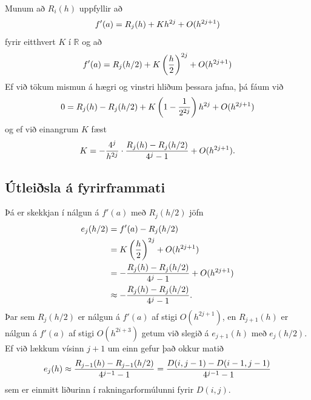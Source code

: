 \documentclass[letterpaper,10pt,icelandic]{sphinxmanual}
\begin{document}
Munum að \(R_i(h)\) uppfyllir að
\begin{gather}
\begin{split}f'(a) = R_j(h) + Kh^{2j} + O(h^{2j+1})\end{split}\notag
\end{gather}
fyrir eitthvert \(K\) í \(\mathbb R\) og að
\begin{gather}
\begin{split}f'(a) = R_j(h/2) + K \left( \frac{h}{2} \right)^{2j}
  + O(h^{2j+1})\end{split}\notag
\end{gather}
Ef við tökum mismun á hægri og vinstri hliðum þessara jafna, þá fáum við
\begin{gather}
\begin{split}0 = R_j(h) - R_j(h/2) + K \left(1 - \frac{1}{2^{2j}}\right)h^{2j}
  + O(h^{2j+1})\end{split}\notag
\end{gather}
og ef við einangrum \(K\) fæst
\begin{gather}
\begin{split}K = -\frac{4^{j}}{h^{2j}} \cdot \frac{R_j(h)-R_j(h/2)}{4^{j}-1} +
O(h^{2j+1}).\end{split}\notag
\end{gather}

\subsection{Útleiðsla á fyrirframmati}
\label{kafli04:utleisla-a-fyrirframmati}
Þá er skekkjan í nálgun á \(f'(a)\) með \(R_j(h/2)\) jöfn
\begin{gather}
\begin{split}\begin{aligned}
  e_j(h/2) &= f'(a) - R_j(h/2) \\
  &= K\left(\frac{h}{2}\right)^{2j} + O(h^{2j+1}) \\
  &= -\frac{R_j(h)-R_j(h/2)}{4^{j}-1} + O(h^{2j+1}) \\
  &\approx -\frac{R_j(h)-R_j(h/2)}{4^{j}-1}.\end{aligned}\end{split}\notag
\end{gather}
Þar sem \(R_j(h/2)\) er nálgun á \(f'(a)\) af stigi
\(O(h^{2j+1})\), en \(R_{j+1}(h)\) er nálgun á \(f'(a)\) af
stigi \(O(h^{2i+3})\) getum við slegið á \(e_{j+1}(h)\) með
\(e_j(h/2)\). Ef við lækkum vísinn \(j+1\) um einn gefur það
okkur matið
\begin{gather}
\begin{split}e_j(h) \approx \frac{R_{j-1}(h)-R_{j-1}(h/2)}{4^{j-1}-1} =
  \frac{D(i,j-1)-D(i-1,j-1)}{4^{j-1}-1}\end{split}\notag
\end{gather}
sem er einmitt liðurinn í rakningarformúlunni fyrir \(D(i,j)\).
\end{document}
